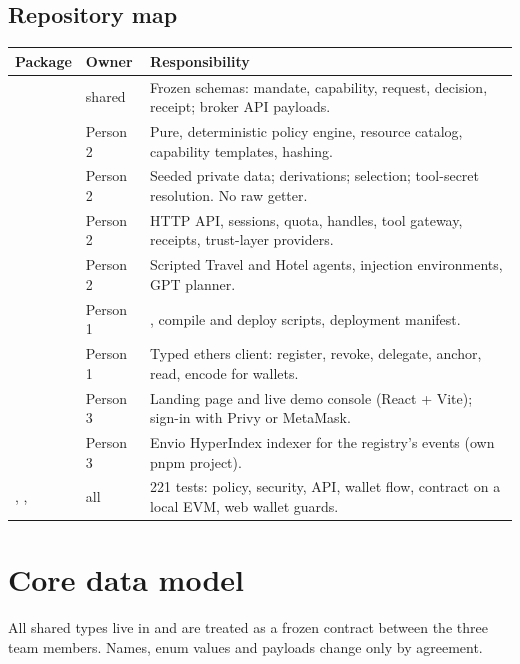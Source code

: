 \documentclass[11pt,a4paper]{article}
\begin{document}
\subsection{Repository map}
\begin{center}
\renewcommand{\arraystretch}{1.3}
\small
\begin{tabularx}{\textwidth}{@{}l l Y@{}}
\toprule
\textbf{Package} & \textbf{Owner} & \textbf{Responsibility}\\
\midrule
{} & shared & Frozen schemas: mandate, capability, request, decision, receipt; broker API payloads.\\
 & Person 2 & Pure, deterministic policy engine, resource catalog, capability templates, hashing.\\
 & Person 2 & Seeded private data; derivations; selection; tool-secret resolution. No raw getter.\\
 & Person 2 & HTTP API, sessions, quota, handles, tool gateway, receipts, trust-layer providers.\\
 & Person 2 & Scripted Travel and Hotel agents, injection environments, GPT planner.\\
 & Person 1 & , compile and deploy scripts, deployment manifest.\\
 & Person 1 & Typed ethers client: register, revoke, delegate, anchor, read, encode for wallets.\\
 & Person 3 & Landing page and live demo console (React + Vite); sign-in with Privy or MetaMask.\\
 & Person 3 & Envio HyperIndex indexer for the registry's events (own pnpm project).\\
, ,  & all & 221 tests: policy, security, API, wallet flow, contract on a local EVM, web wallet guards.\\
\bottomrule
\end{tabularx}
\end{center}

\section{Core data model}\label{sec:model}

All shared types live in  and are treated as a frozen contract between the three team members. Names, enum values and payloads change only by agreement.
\end{document}
